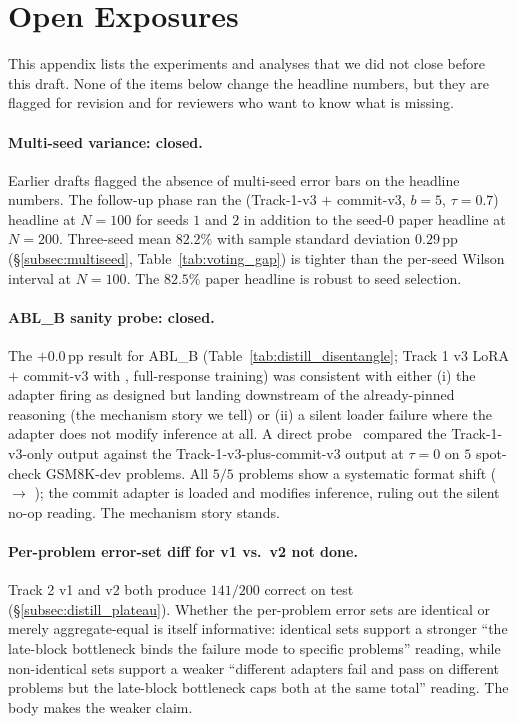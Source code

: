 \section{Open Exposures}
\label{app:open}

This appendix lists the experiments and analyses that we did not
close before this draft.  None of the items below change the
headline numbers, but they are flagged for revision and for
reviewers who want to know what is missing.

\paragraph{Multi-seed variance: closed.}  Earlier drafts flagged
the absence of multi-seed error bars on the headline numbers.
The follow-up phase ran the \cmajc{} (Track-1-v3 $+$ commit-v3,
$b{=}5$, $\tau{=}0.7$) headline at $N{=}100$ for seeds $1$ and
$2$ in addition to the seed-$0$ paper headline at $N{=}200$.
Three-seed mean $82.2\%$ with sample standard deviation
$0.29$\,pp (\S\ref{subsec:multiseed}, Table~\ref{tab:voting_gap})
is tighter than the per-seed Wilson interval at $N{=}100$.
The $82.5\%$ paper headline is robust to seed selection.

\paragraph{ABL\_B sanity probe: closed.}  The $+0.0$\,pp result
for ABL\_B (Table~\ref{tab:distill_disentangle}; Track 1 v3 LoRA
$+$ commit-v3 with , full-response
training) was consistent with either (i) the adapter firing as
designed but landing downstream of the already-pinned reasoning
(the mechanism story we tell) or (ii) a silent loader failure
where the adapter does not modify inference at all.  A direct
probe~\citep{abl_b_result} compared the
Track-1-v3-only output against the
Track-1-v3-plus-commit-v3 output at $\tau{=}0$ on $5$ spot-check
GSM8K-dev problems.  All $5/5$ problems show a systematic format
shift ( $\to$ ); the commit
adapter is loaded and modifies inference, ruling out the silent
no-op reading.  The mechanism story stands.

\paragraph{Per-problem error-set diff for v1 vs.\ v2 not done.}
Track 2 v1 and v2 both produce $141/200$ correct on test
(\S\ref{subsec:distill_plateau}).  Whether the per-problem error
sets are identical or merely aggregate-equal is itself
informative: identical sets support a stronger ``the late-block
bottleneck binds the failure mode to specific problems''
reading, while non-identical sets support a weaker ``different
adapters fail and pass on different problems but the late-block
bottleneck caps both at the same total'' reading.  The body
makes the weaker claim.

